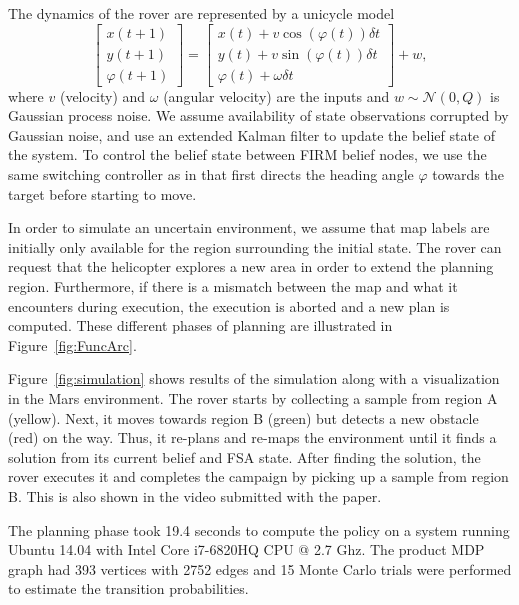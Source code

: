 \documentclass[letterpaper]{article} %
\begin{document}
The dynamics of the rover are represented by a unicycle model
\begin{equation}
    \begin{bmatrix}
        x(t+1) \\
        y(t+1) \\
        \varphi(t+1)
    \end{bmatrix} = \begin{bmatrix}x(t) + v \cos(\varphi(t)) \delta{t}\\ y(t) + v \sin(\varphi(t)) \delta{t}\\ \varphi(t) + \omega \delta{t} \end{bmatrix} + w,
\end{equation}
where $v$ (velocity) and $\omega$ (angular velocity) are the inputs and $w \sim \mathcal N(0, Q)$ is Gaussian process noise. We assume availability of state observations corrupted by Gaussian noise, and use an extended Kalman filter to update the belief state of the system. To control the belief state between FIRM belief nodes, we use the same switching controller as in \cite{Cristi-CDC-2016} that first directs the heading angle $\varphi$ towards the target before starting to move. 

In order to simulate an uncertain environment, we assume that map labels are initially only available for the region surrounding the initial state. The rover can request that the helicopter explores a new area in order to extend the planning region. Furthermore, if there is a mismatch between the map and what it encounters during execution, the execution is aborted and a new plan is computed. These different phases of planning are illustrated in Figure~\ref{fig:FuncArc}.

Figure~\ref{fig:simulation} shows results of the simulation along with a visualization in the Mars environment. 
The rover starts by collecting a sample from region A (yellow). Next, it moves towards region B (green) but detects a new obstacle (red) on the way. Thus, it re-plans and re-maps the environment until it finds a solution from its current belief and FSA state. After finding the solution, the rover executes it and completes the campaign by picking up a sample from region B.
This is also shown in the video submitted with the paper.

The planning phase took 19.4 seconds to compute the policy on a system running Ubuntu 14.04 with Intel Core i7-6820HQ CPU @ 2.7 Ghz. The product MDP graph had 393 vertices with 2752 edges and 15 Monte Carlo trials were performed to estimate the transition probabilities.
\end{document}
